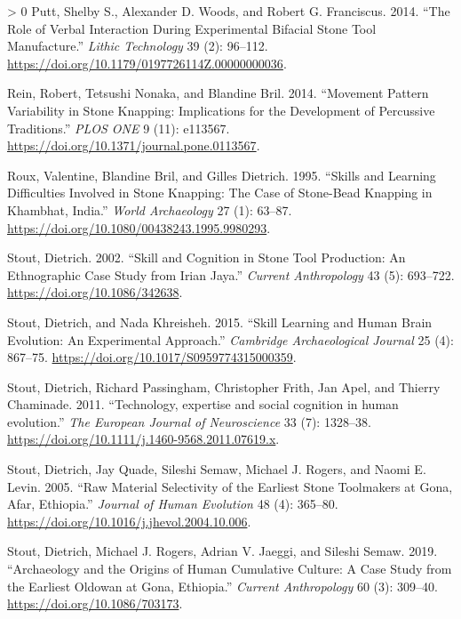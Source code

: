 \documentclass[smallextended]{svjour3}       %
\newlength{\cslhangindent}
\newenvironment{CSLReferences}[3] %
 {%
  \setlength{\parindent}{0pt}
  \ifodd #1 \everypar{\setlength{\hangindent}{\cslhangindent}}\ignorespaces\fi
  \ifnum #2 > 0
  \setlength{\parskip}{#3\baselineskip}
  \fi
 }%
 {}
\begin{document}
\begin{CSLReferences}{1}{0}
\leavevmode\hypertarget{ref-putt2014}{}%
Putt, Shelby S., Alexander D. Woods, and Robert G. Franciscus. 2014.
{``The Role of Verbal Interaction During Experimental Bifacial Stone
Tool Manufacture.''} \emph{Lithic Technology} 39 (2): 96--112.
\url{https://doi.org/10.1179/0197726114Z.00000000036}.

\leavevmode\hypertarget{ref-rein2014}{}%
Rein, Robert, Tetsushi Nonaka, and Blandine Bril. 2014. {``Movement
Pattern Variability in Stone Knapping: Implications for the Development
of Percussive Traditions.''} \emph{PLOS ONE} 9 (11): e113567.
\url{https://doi.org/10.1371/journal.pone.0113567}.

\leavevmode\hypertarget{ref-roux1995}{}%
Roux, Valentine, Blandine Bril, and Gilles Dietrich. 1995. {``Skills and
Learning Difficulties Involved in Stone Knapping: The Case of
Stone{-}Bead Knapping in Khambhat, India.''} \emph{World Archaeology} 27
(1): 63--87. \url{https://doi.org/10.1080/00438243.1995.9980293}.

\leavevmode\hypertarget{ref-stout2002}{}%
Stout, Dietrich. 2002. {``Skill and Cognition in Stone Tool Production:
An Ethnographic Case Study from Irian Jaya.''} \emph{Current
Anthropology} 43 (5): 693--722. \url{https://doi.org/10.1086/342638}.

\leavevmode\hypertarget{ref-stout2015}{}%
Stout, Dietrich, and Nada Khreisheh. 2015. {``Skill Learning and Human
Brain Evolution: An Experimental Approach.''} \emph{Cambridge
Archaeological Journal} 25 (4): 867--75.
\url{https://doi.org/10.1017/S0959774315000359}.

\leavevmode\hypertarget{ref-stout2011}{}%
Stout, Dietrich, Richard Passingham, Christopher Frith, Jan Apel, and
Thierry Chaminade. 2011. {``Technology, expertise and social cognition
in human evolution.''} \emph{The European Journal of Neuroscience} 33
(7): 1328--38. \url{https://doi.org/10.1111/j.1460-9568.2011.07619.x}.

\leavevmode\hypertarget{ref-stout2005}{}%
Stout, Dietrich, Jay Quade, Sileshi Semaw, Michael J. Rogers, and Naomi
E. Levin. 2005. {``Raw Material Selectivity of the Earliest Stone
Toolmakers at Gona, Afar, Ethiopia.''} \emph{Journal of Human Evolution}
48 (4): 365--80. \url{https://doi.org/10.1016/j.jhevol.2004.10.006}.

\leavevmode\hypertarget{ref-stout2019}{}%
Stout, Dietrich, Michael J. Rogers, Adrian V. Jaeggi, and Sileshi Semaw.
2019. {``Archaeology and the Origins of Human Cumulative Culture: A Case
Study from the Earliest Oldowan at Gona, Ethiopia.''} \emph{Current
Anthropology} 60 (3): 309--40. \url{https://doi.org/10.1086/703173}.


\end{CSLReferences}
\end{document}
